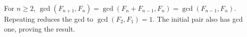 For $n\ge 2$, $\gcd(F_{n+1},F_n)=\gcd(F_n+F_{n-1},F_n)=\gcd(F_{n-1},F_n)$. Repeating reduces the gcd to $\gcd(F_2,F_1)=1$. The initial pair also has gcd one, proving the result.
